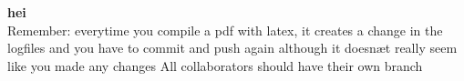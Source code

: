 \documentclass{article}
\begin{document}
    \textbf{hei}\\
    Remember: everytime you compile a pdf with latex, it creates a change in the logfiles and you have to commit and push again although it doesnæt really seem like you made any changes
    All collaborators should have their own branch
\end{document}
